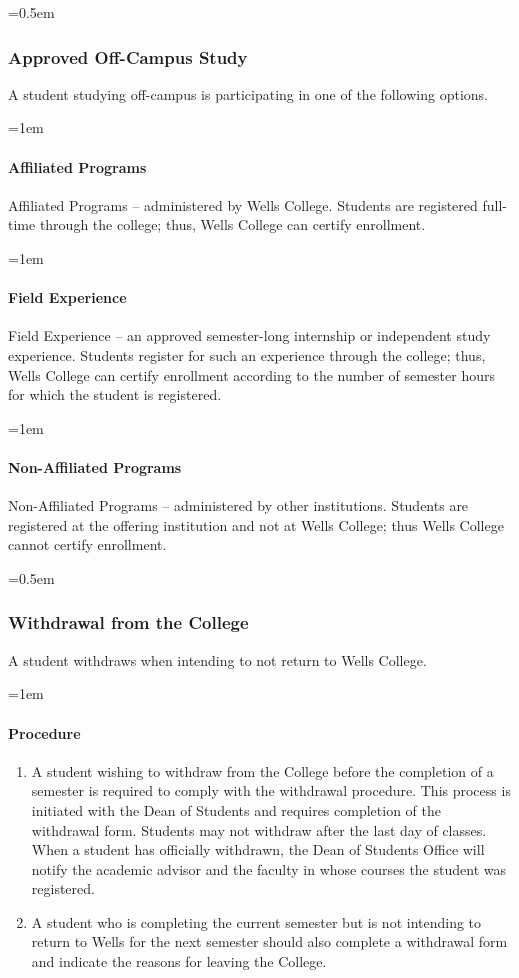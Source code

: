 \documentclass{manual}
\let\oldsubsubsection\subsubsection
\renewcommand\subsubsection{\leftskip=0.5em\oldsubsubsection}
\let\oldparagraph\paragraph
\renewcommand\paragraph{\leftskip=1em\oldparagraph}
\begin{document}
\subsubsection{Approved Off-Campus Study}

A student studying off-campus is participating in one of the following options.

\paragraph{Affiliated Programs}
Affiliated Programs -- administered by Wells College. Students are registered full-time through the college; thus, Wells College can certify enrollment.

\paragraph{Field Experience}
Field Experience -- an approved semester-long internship or independent study experience. Students register for such an experience through the college; thus, Wells College can certify enrollment according to the number of semester hours for which the student is registered.

\paragraph{Non-Affiliated Programs}
Non-Affiliated Programs -- administered by other institutions. Students are registered at the offering institution and not at Wells College; thus Wells College cannot certify enrollment.

\subsubsection{Withdrawal from the College}\label{sub:WithdrawlFromTheCollege}

A student withdraws when intending to not return to Wells College.

\paragraph{Procedure}
\begin{enumerate}[label=\alph*)]
\item A student wishing to withdraw from the College before the completion of a semester is required to comply with the withdrawal procedure. This process is initiated with the Dean of Students and requires completion of the withdrawal form. Students may not withdraw after the last day of classes. When a student has officially withdrawn, the Dean of Students Office will notify the academic advisor and the faculty in whose courses the student was registered.

\item A student who is completing the current semester but is not intending to return to Wells for the next semester should also complete a withdrawal form and indicate the reasons for leaving the College.
\end{enumerate}
\end{document}
